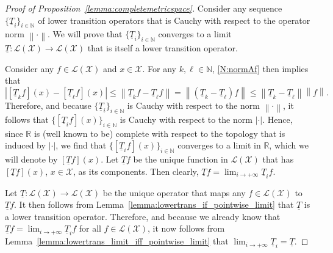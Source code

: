 \documentclass[10pt,a4paper]{paper}
\theoremstyle{definition}
\newcommand{\nats}{\mathbb{N}}
\newcommand{\reals}{\mathbb{R}}
\newcommand{\realspos}{\reals_{>0}}
\newcommand{\states}{\mathcal{X}}
\newcommand{\lt}{\underline{T}}
\newcommand{\gambles}{\mathcal{L}}
\newcommand{\gamblesX}{\gambles(\states)}
\newcommand{\norm}[1]{\left\lVert #1 \right\rVert}
\newcommand{\abs}[1]{\left\vert #1 \right\vert}
\newcommand{\coloneqq}{:\!=}
\begin{document}
\begin{proof}[Proof of Proposition~\ref{lemma:completemetricspace}]
Consider any sequence $\{\lt_i\}_{i\in\nats}$ of lower transition operators that is Cauchy with respect to the operator norm $\norm{\cdot}$. We will prove that $\{\lt_i\}_{i\in\nats}$ converges to a limit $\lt\colon\gamblesX\to\gamblesX$ that is itself a lower transition operator.

Consider any $f\in\gamblesX$ and $x\in\states$. For any $k,\ell\in\nats$, \eqref{N:normAf} then implies that
\begin{equation*}
\abs{[\lt_k f](x)-[\lt_\ell f](x)}
\leq\norm{\lt_k f-\lt_\ell f}
=\norm{(\lt_k-\lt_\ell)f}
\leq\norm{\lt_k-\lt_\ell}\norm{f}.
\end{equation*}
Therefore, and because $\{\lt_i\}_{i\in\nats}$ is Cauchy with respect to the norm $\norm{\cdot}$, it follows that $\{[\lt_i f](x)\}_{i\in\nats}$ is Cauchy with respect to the norm $\abs{\cdot}$. Hence, since $\reals$ is (well known to be) complete with respect to the topology that is induced by $\abs{\cdot}$, we find that $\{[\lt_i f](x)\}_{i\in\nats}$ converges to a limit in $\reals$, which we will denote by $[\lt f](x)$. Let $\lt f$ be the unique function in $\gamblesX$ that has $[\lt f](x)$, $x\in\states$, as its components. Then clearly, $\lt f=\lim_{i\to+\infty}\lt_if$. 

Let $\lt\colon\gamblesX\to\gamblesX$ be the unique operator that maps any $f\in\gamblesX$ to $\lt f$. It then follows from Lemma~\ref{lemma:lowertrans_if_pointwise_limit} that $\lt$ is a lower transition operator. Therefore, and because we already know that $\lt f=\lim_{i\to+\infty}\lt_i f$ for all $f\in\gamblesX$, it now follows from Lemma~\ref{lemma:lowertrans_limit_iff_pointwise_limit} that $\lim_{i\to+\infty}\lt_i=\lt$.
\end{proof}

\end{document}
